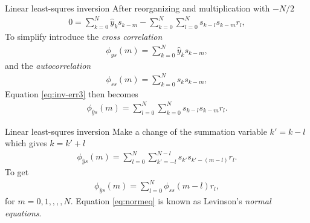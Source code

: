 \documentclass[xcolor=dvipsnames,notes]{beamer}
\begin{document}
%
%
\begin{frame}{Linear least-squres inversion}
After reorganizing and multiplication with $-N/2$
%
\begin{eqnarray}
0 = \sum^N_{k=0}\hat{y}_k s_{k-m} - \sum^N_{k=0}\sum^N_{l=0} s_{k-l} s_{k-m} r_l,
            \label{eq:inv-err3}
\end{eqnarray}
%
To simplify introduce the {\em cross correlation}
%
\begin{eqnarray}
  \phi_{\hat{y} s}(m) =\sum^N_{k=0}\hat{y}_k s_{k-m},
             \label{eq:cross-corr}
\end{eqnarray}
and the {\em autocorrelation}
%
\begin{eqnarray}
  \phi_{s s}(m) =\sum^N_{k=0}s_k s_{k-m},
             \label{eq:auto-corr}
\end{eqnarray}
%
Equation \eqref{eq:inv-err3} then becomes
%
\begin{eqnarray}
\phi_{\hat{y} s}(m)= \sum^N_{l=0}\sum^N_{k=0} s_{k-l} s_{k-m} r_l.
            \label{eq:inv-err5}
\end{eqnarray}
% 
\end{frame}
%
\begin{frame}{Linear least-squres inversion}
Make a change of the summation variable
$k'=k-l$ which gives $k=k'+l$
%
\begin{eqnarray}
\phi_{\hat{y} s}(m)= \sum^N_{l=0}\sum^{N-l}_{k'=-l} s_{k'} s_{k'-(m-l)} r_l.
            \label{eq:inv-err6}
\end{eqnarray}
% 
To get
%
\begin{eqnarray}
\phi_{\hat{y} s}(m)= \sum^N_{l=0}\phi_{s s}(m-l) r_l,
            \label{eq:normeq}
\end{eqnarray}
% 
for $m=0,1,,,,N$.
Equation \eqref{eq:normeq} is known as Levinson's {\em normal equations}.
\end{frame}
%
\end{document}
